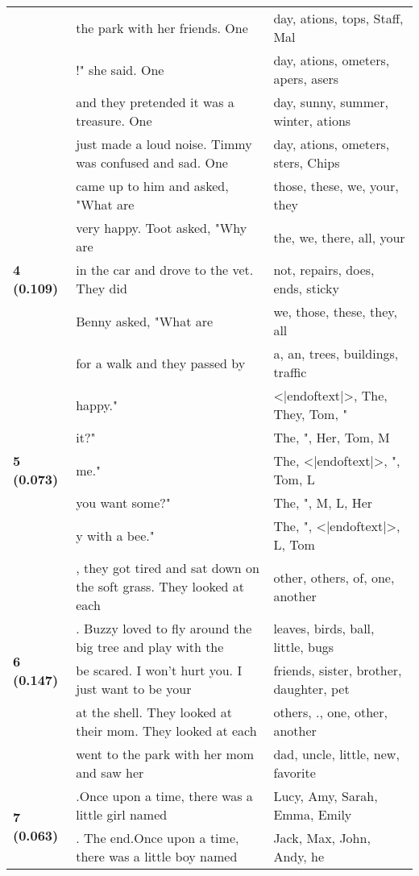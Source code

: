 \documentclass{article}
\begin{document}
\begin{adjustbox}{max width=\textwidth}
\begin{tabular}{p{} p{} p{}}
 & the park with her friends. One & day, ations, tops, Staff, Mal \\
 & !" she said.  One & day, ations, ometers, apers, asers \\
 & and they pretended it was a treasure.  One & day,  sunny,  summer,  winter, ations \\
 & just made a loud noise. Timmy was confused and sad.  One & day, ations, ometers, sters,  Chips \\
\midrule
\multirow{5}{*}{\textbf{4 (0.109)}} & came up to him and asked, "What are & those,  these,  we,  your,  they \\
 & very happy. Toot asked, "Why are & the,  we,  there,  all,  your \\
 & in the car and drove to the vet. They did & not,  repairs,  does, ends,  sticky \\
 & Benny asked, "What are & we,  those,  these,  they,  all \\
 & for a walk and they passed by & a,  an,  trees,  buildings,  traffic \\
\midrule
\multirow{5}{*}{\textbf{5 (0.073)}} & happy." & <|endoftext|>, The, They, Tom, " \\
 & it?" & The, ", Her, Tom, M \\
 & me." & The, <|endoftext|>, ", Tom, L \\
 & you want some?" & The, ", M, L, Her \\
 & y with a bee." & The, ", <|endoftext|>, L, Tom \\
\midrule
\multirow{5}{*}{\textbf{6 (0.147)}} & , they got tired and sat down on the soft grass. They looked at each & other,  others,  of,  one,  another \\
 & . Buzzy loved to fly around the big tree and play with the & leaves,  birds,  ball,  little,  bugs \\
 & be scared. I won't hurt you. I just want to be your & friends,  sister,  brother,  daughter,  pet \\
 & at the shell. They looked at their mom. They looked at each & others, .,  one, other,  another \\
 & went to the park with her mom and saw her & dad,  uncle,  little,  new,  favorite \\
\midrule
\multirow{5}{*}{\textbf{7 (0.063)}} & .Once upon a time, there was a little girl named & Lucy,  Amy,  Sarah,  Emma,  Emily \\
 & . The end.Once upon a time, there was a little boy named & Jack,  Max,  John,  Andy,  he \\

\end{tabular}
\end{adjustbox}
\end{document}
